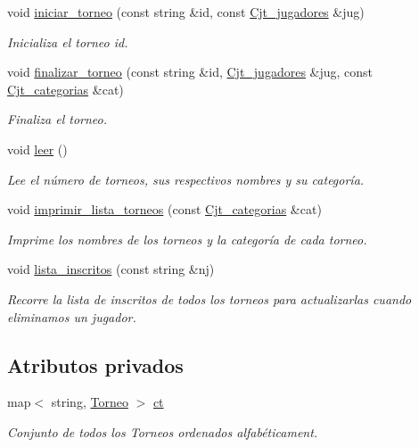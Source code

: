 \begin{DoxyCompactItemize}
void \hyperlink{class_cjt__torneos_aa6ca6587e715b38907a0af67f0e13da4}{iniciar\+\_\+torneo} (const string \&id, const \hyperlink{class_cjt__jugadores}{Cjt\+\_\+jugadores} \&jug)
\begin{DoxyCompactList}\small\item\em Inicializa el torneo id. \end{DoxyCompactList}\item 
void \hyperlink{class_cjt__torneos_adba857b43ab1282910fe1567dde5839f}{finalizar\+\_\+torneo} (const string \&id, \hyperlink{class_cjt__jugadores}{Cjt\+\_\+jugadores} \&jug, const \hyperlink{class_cjt__categorias}{Cjt\+\_\+categorias} \&cat)
\begin{DoxyCompactList}\small\item\em Finaliza el torneo. \end{DoxyCompactList}\item 
void \hyperlink{class_cjt__torneos_af0f18e3971687674b58d020689fa2203}{leer} ()
\begin{DoxyCompactList}\small\item\em Lee el número de torneos, sus respectivos nombres y su categoría. \end{DoxyCompactList}\item 
void \hyperlink{class_cjt__torneos_a29ca3cb4f9fd9f5924b07add78601f40}{imprimir\+\_\+lista\+\_\+torneos} (const \hyperlink{class_cjt__categorias}{Cjt\+\_\+categorias} \&cat)
\begin{DoxyCompactList}\small\item\em Imprime los nombres de los torneos y la categoría de cada torneo. \end{DoxyCompactList}\item 
void \hyperlink{class_cjt__torneos_a6acf54664dd8dd524d9f9671e83b181b}{lista\+\_\+inscritos} (const string \&nj)
\begin{DoxyCompactList}\small\item\em Recorre la lista de inscritos de todos los torneos para actualizarlas cuando eliminamos un jugador. \end{DoxyCompactList}\end{DoxyCompactItemize}
\subsection*{Atributos privados}
\begin{DoxyCompactItemize}
\item 
map$<$ string, \hyperlink{class_torneo}{Torneo} $>$ \hyperlink{class_cjt__torneos_a701df4fc4fbd2d6ffa081a01845083f3}{ct}
\begin{DoxyCompactList}\small\item\em Conjunto de todos los Torneos ordenados alfabéticament. \end{DoxyCompactList}\end{DoxyCompactItemize}


